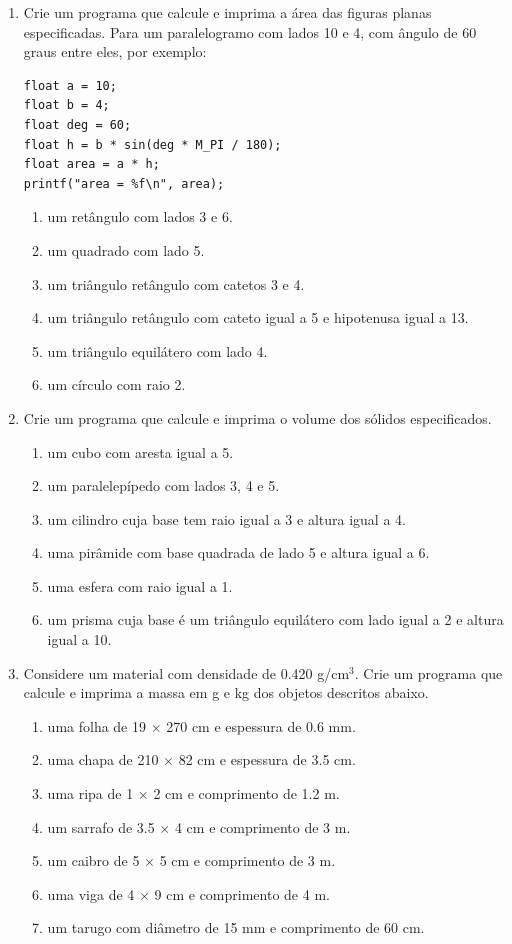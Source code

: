 \begin{enumerate}
  \item Crie um programa que calcule e imprima a área das figuras planas especificadas. Para um paralelogramo com lados 10 e 4, com ângulo de 60 graus entre eles, por exemplo:
\begin{lstlisting}
float a = 10;
float b = 4;
float deg = 60;
float h = b * sin(deg * M_PI / 180);
float area = a * h;
printf("area = %f\n", area);
\end{lstlisting}

    \begin{enumerate}
      \item um retângulo com lados 3 e 6.
      \item um quadrado com lado 5.
      \item um triângulo retângulo com catetos 3 e 4.
      \item um triângulo retângulo com cateto igual a 5 e hipotenusa igual a 13.
      \item um triângulo equilátero com lado 4.
      \item um círculo com raio 2.
    \end{enumerate}

  \item Crie um programa que calcule e imprima o volume dos sólidos especificados.
    \begin{enumerate}
      \item um cubo com aresta igual a 5.
      \item um paralelepípedo com lados 3, 4 e 5.
      \item um cilindro cuja base tem raio igual a 3 e altura igual a 4.
      \item uma pirâmide com base quadrada de lado 5 e altura igual a 6.
      \item uma esfera com raio igual a 1.
      \item um prisma cuja base é um triângulo equilátero com lado igual a 2 e altura igual a 10.
    \end{enumerate}

  \item Considere um material com densidade de 0.420 g/cm$^3$. Crie um programa que calcule e imprima a massa em g e kg dos objetos descritos abaixo.
    \begin{enumerate}
      \item uma folha de 19 $\times$ 270 cm e espessura de 0.6 mm.
      \item uma chapa de 210 $\times$ 82 cm e espessura de 3.5 cm.
      \item uma ripa de 1 $\times$ 2 cm e comprimento de 1.2 m.
      \item um sarrafo de 3.5 $\times$ 4 cm e comprimento de 3 m.
      \item um caibro de 5 $\times$ 5 cm e comprimento de 3 m.
      \item uma viga de 4 $\times$ 9 cm e comprimento de 4 m.
      \item um tarugo com diâmetro de 15 mm e comprimento de 60 cm.
    \end{enumerate}


\end{enumerate}
